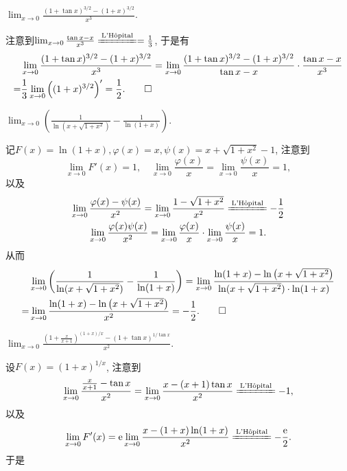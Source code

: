 \begin{quiza}
\begin{quizs}
\begin{solution}
\[\begin{split}
\end{split}\]
\end{solution}
\item \(\lim_{x\rightarrow 0}\frac{(1+\tan x)^{3/2}-(1+x)^{3/2}}{x^3}.\)
\begin{solution}
注意到\(\lim_{x\rightarrow 0}\frac{\tan x-x}{x^3}\xlongequal{\text{L'H\^{o}pital}}=\frac{1}{3}\), 于是有\[\begin{split}
&\lim_{x\rightarrow 0}\frac{(1+\tan x)^{3/2}-(1+x)^{3/2}}{x^3}=\lim_{x\rightarrow 0}\frac{(1+\tan x)^{3/2}-(1+x)^{3/2}}{\tan x-x}\cdot\frac{\tan x-x}{x^3}\\=&\frac{1}{3}\lim_{x\rightarrow 0}\left((1+x)^{3/2}\right)'=\frac{1}{2}.\qedhere
\end{split}\]
\end{solution}
\item \(\lim_{x\rightarrow 0}\left(\frac{1}{\ln (x+\sqrt{1+x^2})}-\frac{1}{\ln(1+x)}\right).\)
\begin{solution}
记\(F(x)=\ln(1+x),\varphi(x)=x,\psi(x)=x+\sqrt{1+x^2}-1\), 注意到\[\lim_{x\rightarrow 0}F'(x)=1,\quad\lim_{x\rightarrow 0}\frac{\varphi(x)}{x}=\lim_{x\rightarrow 0}\frac{\psi(x)}{x}=1,\]以及\begin{gather*}
\lim_{x\rightarrow 0}\frac{\varphi(x)-\psi(x)}{x^2}=\lim_{x\rightarrow 0}\frac{1-\sqrt{1+x^2}}{x^2}\xlongequal{\text{L'H\^{o}pital}}-\frac{1}{2}\\
\lim_{x\rightarrow 0}\frac{\varphi(x)\psi(x)}{x^2}=\lim_{x\rightarrow 0}\frac{\varphi(x)}{x}\cdot\lim_{x\rightarrow 0}\frac{\psi(x)}{x}=1.
\end{gather*}
从而\[\begin{split}
&\lim_{x\rightarrow 0}\left(\frac{1}{\ln (x+\sqrt{1+x^2})}-\frac{1}{\ln(1+x)}\right)=\lim_{x\rightarrow 0}\frac{\ln(1+x)-\ln\left(x+\sqrt{1+x^2}\right)}{\ln (x+\sqrt{1+x^2})\cdot\ln(1+x)}\\
=&\lim_{x\rightarrow 0}\frac{\ln(1+x)-\ln\left(x+\sqrt{1+x^2}\right)}{x^2}=-\frac{1}{2}.\qedhere
\end{split}\]
\end{solution}
\item \(\lim_{x\rightarrow 0}\frac{\left(1+\frac{x}{x+1}\right)^{(1+x)/x}-\left(1+\tan x\right)^{1/\tan x}}{x^2}\).
\begin{solution}
设\(F(x)=\left(1+x\right)^{1/x}\), 注意到\[\lim_{x\rightarrow 0}\frac{\frac{x}{x+1}-\tan x}{x^2}=\lim_{x\rightarrow0}\frac{x-(x+1)\tan x}{x^2}\xlongequal{\text{L'H\^{o}pital}}-1,\]以及\[\lim_{x\rightarrow 0}F'(x)=\ee\lim_{x\rightarrow 0}\frac{x-(1+x)\ln(1+x)}{x^2}\xlongequal{\text{L'H\^{o}pital}}-\frac{\ee}{2}.\]于是\[\begin{split}

\end{split}\]
\end{solution}
\end{quizs}
\end{quiza}
